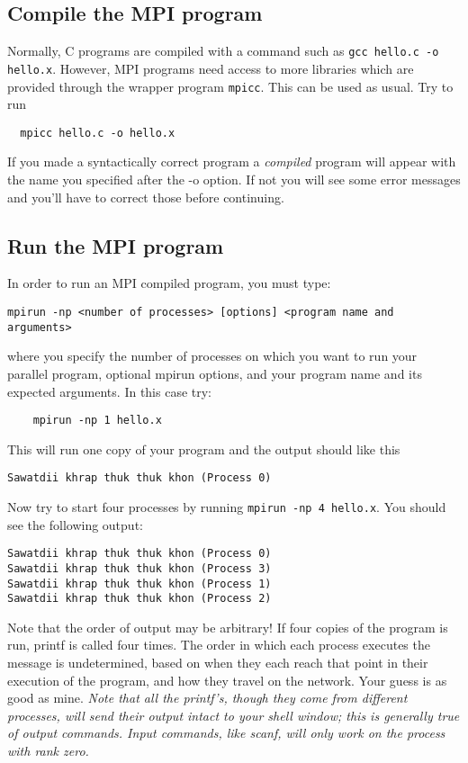 \documentclass[12pt]{article}
\begin{document}
\subsection*{Compile the MPI program}

Normally, C programs are compiled with a command such as
\texttt{gcc hello.c -o hello.x}. However, MPI programs need access to
more libraries which are provided through the wrapper program
\texttt{mpicc}. This can be used as usual. Try to run
\begin{verbatim}
  mpicc hello.c -o hello.x
\end{verbatim}
If you made a syntactically correct program a \emph{compiled}
program will appear with the name you specified after the -o option.
If not you will see some error messages and you'll have to correct
those before continuing.

\subsection*{Run the MPI program}
In order to run an MPI compiled program, you must type:
\begin{verbatim}
mpirun -np <number of processes> [options] <program name and arguments>
\end{verbatim}
where you specify the number of processes on which you want to run
your parallel program, optional mpirun options,
and your program name and its expected arguments.
In this case try:
\begin{verbatim}
    mpirun -np 1 hello.x
\end{verbatim}
This will run one copy of your program and the output should like this
\begin{verbatim}
Sawatdii khrap thuk thuk khon (Process 0)
\end{verbatim}

Now try to start four processes by running \texttt{mpirun -np 4 hello.x}.
You should see the following output:
\begin{verbatim}
Sawatdii khrap thuk thuk khon (Process 0)
Sawatdii khrap thuk thuk khon (Process 3)
Sawatdii khrap thuk thuk khon (Process 1)
Sawatdii khrap thuk thuk khon (Process 2)
\end{verbatim}
Note that the order of output may be arbitrary!  If four copies of the
program is run, printf is called four times.  The order in which each
process executes the message is undetermined, based on when they each
reach that point in their execution of the program, and how they
travel on the network. Your guess is as good as mine.
\emph{Note that all the printf's, though they come from different
  processes, will send their output intact to your shell window; this
  is generally true of output commands. Input commands, like scanf,
  will only work on the process with rank zero.}
\end{document}
